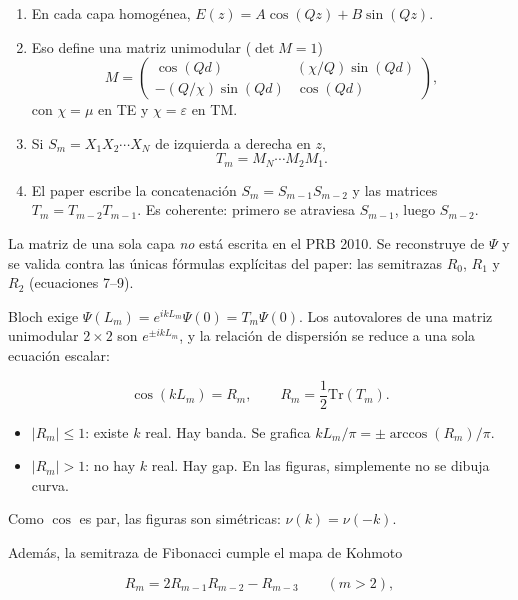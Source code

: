 \documentclass[11pt,a4paper]{article}
\begin{document}
\begin{enumerate}
\item En cada capa homogénea, \(E(z)=A\cos(Qz)+B\sin(Qz)\).
\item Eso define una matriz unimodular (\(\det M=1\))
\begin{equation}
M=\begin{pmatrix}
\cos(Qd) & (\chi/Q)\sin(Qd)\\
-(Q/\chi)\sin(Qd) & \cos(Qd)
\end{pmatrix},
\end{equation}
con \(\chi=\mu\) en TE y \(\chi=\varepsilon\) en TM.
\item Si \(S_m=X_1X_2\cdots X_N\) de izquierda a derecha en \(z\),
\begin{equation}
T_m=M_N\cdots M_2 M_1.
\end{equation}
\item El paper escribe la concatenación \(S_m=S_{m-1}S_{m-2}\) y las matrices
\(T_m=T_{m-2}T_{m-1}\). Es coherente: primero se atraviesa \(S_{m-1}\), luego
\(S_{m-2}\).
\end{enumerate}

La matriz de una sola capa \emph{no} está escrita en el PRB 2010.
Se reconstruye de \(\Psi\) y se valida contra las únicas fórmulas explícitas
del paper: las semitrazas \(R_0\), \(R_1\) y \(R_2\) (ecuaciones 7--9).

Bloch exige \(\Psi(L_m)=e^{ik L_m}\Psi(0)=T_m\Psi(0)\).
Los autovalores de una matriz unimodular \(2\times 2\) son \(e^{\pm ik L_m}\),
y la relación de dispersión se reduce a una sola ecuación escalar:

\begin{equation}
\cos(k L_m)=R_m,\qquad R_m=\frac12\mathrm{Tr}(T_m).
\end{equation}

\begin{itemize}
\item \(\lvert R_m\rvert\le 1\): existe \(k\) real. Hay banda. Se grafica
\(k L_m/\pi=\pm\arccos(R_m)/\pi\).
\item \(\lvert R_m\rvert>1\): no hay \(k\) real. Hay gap. En las figuras,
simplemente no se dibuja curva.
\end{itemize}

Como \(\cos\) es par, las figuras son simétricas:
\(\nu(k)=\nu(-k)\).

Además, la semitraza de Fibonacci cumple el mapa de Kohmoto

\begin{equation}
R_m=2 R_{m-1} R_{m-2}-R_{m-3}\qquad(m>2),
\end{equation}
\end{document}
